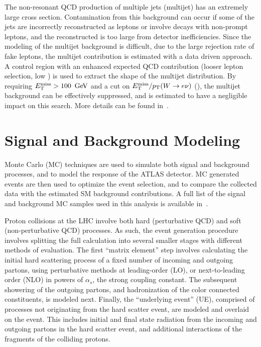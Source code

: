 The non-resonant QCD production of multiple jets (multijet) has an extremely large cross section. Contamination from this background can occur if some of the jets are incorrectly reconstructed as leptons or involve decays with non-prompt leptons, and the reconstructed \MET is too large from detector inefficiencies. Since the modeling of the multijet background is difficult, due to the large rejection rate of fake leptons, the multijet contribution is estimated with a data driven approach. A control region with an enhanced expected QCD contribution (looser lepton selection, low \MET) is used to extract the shape of the multijet distribution. By requiring $\MET>100\,\GeV$ and a cut on $E_{\text{T}}^{\text{miss}}/p_{\text{T}}(W\rightarrow e\nu)$ (\Ch{\ref{ch:event_selection}}), the multijet background can be effectively suppressed, and is estimated to have a negligible impact on this search. More details can be found in~\App{\ref{ch:qcd}}.




%
\section{Signal and Background Modeling}
\label{ch:analysisStrategy:sig_bkg_model}
Monte Carlo (MC) techniques are used to simulate both signal and background processes, and to model the response of the ATLAS detector. MC generated events are then used to optimize the event selection, and to compare the collected data with the estimated SM background contributions. A full list of the signal and background MC samples used in this analysis is available in~\App{\ref{ch:samples}}.

Proton collisions at the LHC involve both hard (perturbative QCD) and soft (non-perturbative QCD) processes. As such, the event generation procedure involves splitting the full calculation into several smaller stages with different methods of evaluation. The first ``matrix element'' step involves calculating the initial hard scattering process of a fixed number of incoming and outgoing partons, using perturbative methods at leading-order (LO), or next-to-leading order (NLO) in powers of $\alpha_s$, the strong coupling constant. The subsequent showering of the outgoing partons, and hadronization of the color connected constituents, is modeled next. Finally, the ``underlying event'' (UE), comprised of processes not originating from the hard scatter event, are modeled and overlaid on the event. This includes initial and final state radiation from the incoming and outgoing partons in the hard scatter event, and additional interactions of the fragments of the colliding protons.

